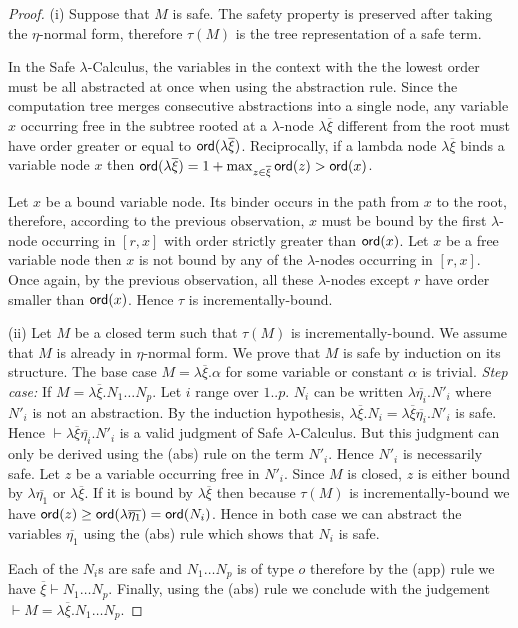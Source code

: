 \begin{proof}
(i) Suppose that $M$ is safe. The safety property is preserved after
taking the $\eta$-normal form, therefore $\tau(M)$ is the tree representation of a safe term.

In the Safe $\lambda$-Calculus, the variables in the context with the the lowest order must be all abstracted 
at once when using the abstraction rule. Since the computation
tree merges consecutive abstractions into a single node,
any variable $x$ occurring free in the subtree rooted at a $\lambda$-node $\lambda \overline{\xi}$ different from the root
must have order greater or equal to ${\sf ord}(\lambda \overline{\xi})$. Reciprocally, if a lambda node
$\lambda \overline{\xi}$ binds a variable node $x$ then
${\sf ord}(\lambda \overline{\xi}) = 1+\max_{z\in\overline{\xi}} {\sf ord}(z) > {\sf ord}(x)$.

Let $x$ be a bound variable node. Its binder occurs in the path from $x$ 
to the root, therefore, according to the previous observation, $x$ must be bound
by the first $\lambda$-node occurring in $[r,x]$ with order strictly
greater than ${\sf ord}(x)$. Let $x$ be a free variable node then $x$ is not bound 
by any of the $\lambda$-nodes occurring in $[r,x]$. Once again, by the previous observation, all
these $\lambda$-nodes except $r$ have order smaller than ${\sf ord}(x)$. Hence
$\tau$ is incrementally-bound.

(ii) Let $M$ be a closed term such that $\tau(M)$ is incrementally-bound.
We assume that $M$ is already in $\eta$-normal form.
We prove that $M$ is safe by induction on its structure. The base case $M =
\lambda \overline{\xi} . \alpha$ for some variable or constant
$\alpha$ is trivial.
\emph{Step case:} If $M = \lambda \overline{\xi} . N_1 \ldots N_p$.
Let $i$ range over $1..p$. $N_i$ can be written $\lambda
\overline{\eta_i} . N'_i$ where $N'_i$ is not an abstraction. By the
induction hypothesis, $\lambda \overline{\xi} . N_i = \lambda
\overline{\xi} \overline{\eta_i} . N'_i$ is safe. 
Hence $\vdash \lambda \overline{\xi} \overline{\eta_i} . N'_i$
is a valid judgment of Safe $\lambda$-Calculus. 
But this judgment can only be derived using the (abs) rule on the term $N'_i$. Hence
$N'_i$ is necessarily safe. Let $z$ be a variable occurring free in
$N'_i$. Since $M$ is closed, $z$ is either bound by $\lambda
\overline{\eta_1}$ or $\lambda \overline{\xi}$. If it is bound by
$\lambda \overline{\xi}$ then because $\tau(M)$ is
incrementally-bound we have ${\sf ord}(z) \geq {\sf ord}(\lambda
\overline{\eta_1}) = {\sf ord}(N_i)$. Hence in both case we can abstract the variables
$\overline{\eta_1}$ using the (abs) rule which shows that $N_i$ is safe.

Each of the $N_i$s are safe and $N_1 \ldots N_p$ is of type $o$ therefore 
by the (app) rule we have $\overline{\xi} \vdash N_1 \ldots N_p$. Finally, using the (abs) rule we conclude 
with the judgement $\vdash M = \lambda \overline{\xi} . N_1 \ldots N_p$.
\end{proof}

